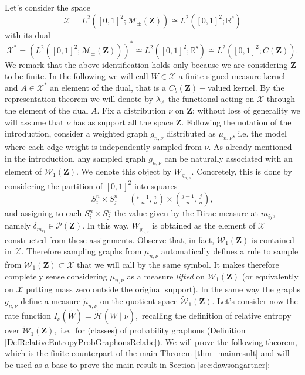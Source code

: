\documentclass[12pt,twoside,a4paper]{article}
\newcommand{\Square}{{S^n_i\times S^n_j}}
\newcommand{\Space}{\mathbf{Z}}
\newcommand{\CbFunct}{C_b(\Space)}
\newcommand{\Graphon}{\mathcal{W}_1}
\newcommand{\UGraphon}{\widetilde{\mathcal{W}}_1}
\begin{document}
Let's consider the space 
\[
\mathcal{X}=L^2([0,1]^2;\mathcal{M}_{\pm}(\Space))\cong L^2([0,1]^2;\mathbb{R}^s)
\] 
with its dual 
\[
\mathcal{X}^*=(L^2([0,1]^2;\mathcal{M}_{\pm}(\Space)))^*\cong L^2([0,1]^2;\mathbb{R}^s)\cong   L^2([0,1]^2;C(\Space)).
\]
We remark that the above identification holds only because we are considering $\Space$ to be finite. In the following we will call $W\in \mathcal{X}$ a finite signed measure kernel and $A\in\mathcal{X}^*$ an element of the dual, that is a $\CbFunct-$valued kernel. By the representation theorem we will denote by $\lambda_A$ the functional acting on $\mathcal{X}$ through the element of the dual $A$. Fix a distribution $\nu$ on $\Space$; without loss of generality we will assume that $\nu$ has as support all the space $\Space$. Following the notation of the introduction, consider a weighted graph $g_{n,\nu}$ distributed as $\mu_{n,\nu}$, i.e. the model where each edge weight is independently sampled from $\nu$. As already mentioned in the introduction, any sampled graph $g_{n,\nu}$ can be naturally associated with an element of $\Graphon(\Space)$. We denote this object by $W_{g_{n,\nu}}$. Concretely, this is done by considering the partition of $[0,1]^2$ into squares
\[
\Square = \left( \tfrac{i-1}{n}, \tfrac{i}{n} \right) \times \left( \tfrac{j-1}{n}, \tfrac{j}{n} \right),
\]
and assigning to each $\Square$ the value given by the Dirac measure at $m_{ij}$, namely $\delta_{m_{ij}} \in \mathcal{P}(\Space)$. In this way, $W_{g_{n,\nu}}$ is obtained as the element of $\mathcal{X}$ constructed from these assignments. Observe that, in fact, $\Graphon(\Space)$ is contained in $\mathcal{X}$. Therefore sampling graphs from $\mu_{n,\nu}$ automatically defines a rule to sample from $\Graphon(\Space) \subset \mathcal{X}$ that we will call by the same symbol. It makes therefore completely sense considering $\mu_{n,\nu}$ as a measure \emph{lifted} on $\Graphon(\Space)$ (or equivalently on $\mathcal{X}$ putting mass zero outside the original support). In the same way the graphs $g_{n,\nu}$ define a measure $\widetilde{\mu}_{n,\nu}$ on the quotient space $\UGraphon(\Space)$. 
Let's consider now the rate function $I_{\nu}(\widetilde{W})=\widetilde{\mathcal{H}}(\widetilde{W} \mid \nu),$ recalling the definition of relative entropy over $\UGraphon(\Space),$ i.e.\ for (classes) of probability graphons (Definition \ref{DefRelativeEntropyProbGraphonsRelabe}). We will prove the following theorem, which is the finite counterpart of the main Theorem \ref{thm_mainresult} and will be used as a base to prove the main result in Section \ref{sec:dawsongartner}:
\end{document}
